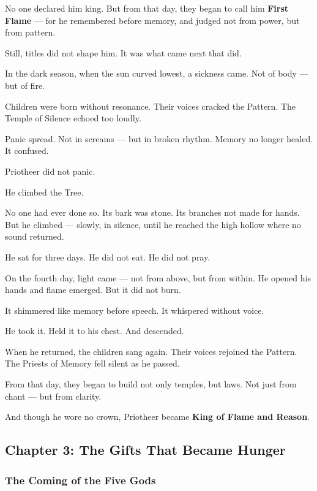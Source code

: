 \documentclass[12pt]{article}
\begin{document}
No one declared him king.  
But from that day, they began to call him \textbf{First Flame} —  
for he remembered before memory,  
and judged not from power, but from pattern.

Still, titles did not shape him.  
It was what came next that did.

In the dark season, when the sun curved lowest, a sickness came.  
Not of body — but of fire.

Children were born without resonance.  
Their voices cracked the Pattern.  
The Temple of Silence echoed too loudly.

Panic spread.  
Not in screams — but in broken rhythm.  
Memory no longer healed. It confused.

Priotheer did not panic.

He climbed the Tree.

No one had ever done so.  
Its bark was stone. Its branches not made for hands.  
But he climbed — slowly, in silence, until he reached the high hollow where no sound returned.

He sat for three days.  
He did not eat.  
He did not pray.

On the fourth day, light came — not from above, but from within.  
He opened his hands and flame emerged.  
But it did not burn.

It shimmered like memory before speech.  
It whispered without voice.

He took it.  
Held it to his chest.  
And descended.

When he returned, the children sang again.  
Their voices rejoined the Pattern.  
The Priests of Memory fell silent as he passed.

From that day, they began to build not only temples, but laws.  
Not just from chant — but from clarity.

And though he wore no crown, Priotheer became  
\textbf{King of Flame and Reason}.

\newpage

\subsection*{Chapter 3: The Gifts That Became Hunger}

\vspace{.5in}

\subsubsection*{The Coming of the Five Gods}
\end{document}
